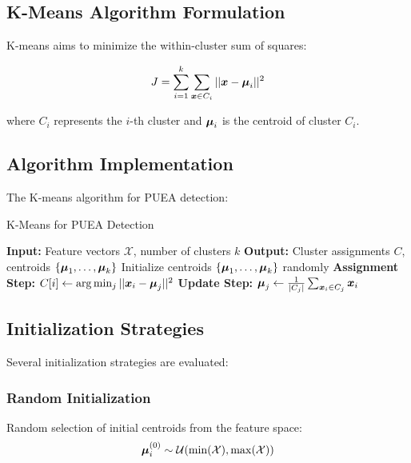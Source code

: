 \subsection{K-Means Algorithm Formulation}
K-means aims to minimize the within-cluster sum of squares:

\begin{equation}
J = \sum_{i=1}^{k} \sum_{\boldsymbol{x} \in C_i} ||\boldsymbol{x} - \boldsymbol{\mu}_i||^2
\end{equation}

where $C_i$ represents the $i$-th cluster and $\boldsymbol{\mu}_i$ is the centroid of cluster $C_i$.

\subsection{Algorithm Implementation}
The K-means algorithm for PUEA detection:

\begin{algorithm}
\caption{K-Means for PUEA Detection}
\begin{algorithmic}[1]
\State \textbf{Input:} Feature vectors $\mathcal{X}$, number of clusters $k$
\State \textbf{Output:} Cluster assignments $C$, centroids $\{\boldsymbol{\mu}_1, \ldots, \boldsymbol{\mu}_k\}$
\State Initialize centroids $\{\boldsymbol{\mu}_1, \ldots, \boldsymbol{\mu}_k\}$ randomly
\Repeat
    \State \textbf{Assignment Step:}
        \State $C[i] \leftarrow \arg\min_{j} ||\boldsymbol{x}_i - \boldsymbol{\mu}_j||^2$
    \EndFor
    \State \textbf{Update Step:}
        \State $\boldsymbol{\mu}_j \leftarrow \frac{1}{|C_j|} \sum_{\boldsymbol{x}_i \in C_j} \boldsymbol{x}_i$
    \EndFor
{}
\end{algorithmic}
\end{algorithm}

\subsection{Initialization Strategies}
Several initialization strategies are evaluated:

\subsubsection{Random Initialization}
Random selection of initial centroids from the feature space:
\begin{equation}
\boldsymbol{\mu}_i^{(0)} \sim \mathcal{U}(\min(\mathcal{X}), \max(\mathcal{X}))
\end{equation}

